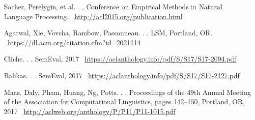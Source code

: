 \documentclass[11pt]{article}
\begin{document}
%
%

\begin{thebibliography}{}

{Socher, Perelygin, et al}.
.
,
\newblock Conference on Empirical Methods in Natural Language Processing.
\newblock ~\url{http://acl2015.org/publication.html}

{Agarwal, Xie, Vovsha, Rambow, Passonneau}.
.
.
\newblock LSM, Portland, OR.
\newblock ~\url{https://dl.acm.org/citation.cfm?id=2021114}

{Cliche}.
.
.
\newblock SemEval, 2017
\newblock ~\url{https://aclanthology.info/pdf/S/S17/S17-2094.pdf}

{Balikas}.
.
.
\newblock SemEval, 2017
\newblock ~\url{https://aclanthology.info/pdf/S/S17/S17-2127.pdf}

{Maas, Daly, Pham, Huang, Ng, Potts}.
.
.
\newblock Proceedings of the 49th Annual Meeting of the Association for 
Computational Linguistics, pages 142–150, Portland, OR, 2017
\newblock ~\url{http://aclweb.org/anthology/P/P11/P11-1015.pdf}

\end{thebibliography}
\end{document}
